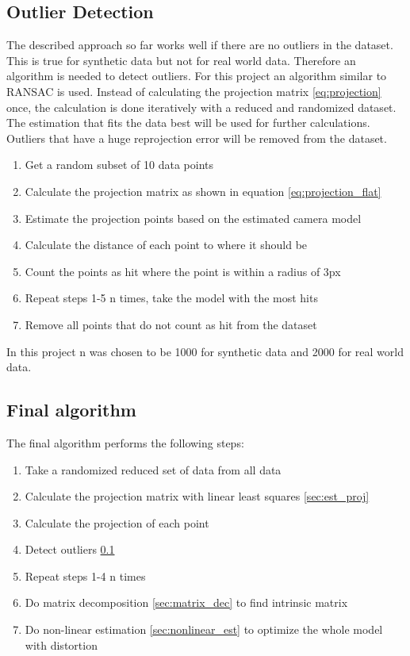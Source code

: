 \documentclass[11pt,a4paper,titlepage,oneside]{report}
\begin{document}
\subsection{Outlier Detection}\label{sec:outliers}
The described approach so far works well if there are no outliers in the dataset. This is true for synthetic data but not for real world data. Therefore an algorithm is needed to detect outliers. For this project an algorithm similar to RANSAC \cite{ransac} is used. Instead of calculating the projection matrix \ref{eq:projection} once, the calculation is done iteratively with a reduced and randomized dataset. The estimation that fits the data best will be used for further calculations. Outliers that have a huge reprojection error will be removed from the dataset.
\begin{enumerate}
	\item Get a random subset of 10 data points
	\item Calculate the projection matrix as shown in equation \ref{eq:projection_flat}
	\item Estimate the projection points based on the estimated camera model
	\item Calculate the distance of each point to where it should be
	\item Count the points as hit where the point is within a radius of 3px
	\item Repeat steps 1-5 n times, take the model with the most hits
	\item Remove all points that do not count as hit from the dataset
\end{enumerate}

In this project n was chosen to be 1000 for synthetic data and 2000 for real world data.

\subsection{Final algorithm}
The final algorithm performs the following steps:
\begin{enumerate}
	\item Take a randomized reduced set of data from all data
	\item Calculate the projection matrix with linear least squares \ref{sec:est_proj}
	\item Calculate the projection of each point
	\item Detect outliers \ref{sec:outliers}
	\item Repeat steps 1-4 n times
	\item Do matrix decomposition \ref{sec:matrix_dec} to find intrinsic matrix
	\item Do non-linear estimation \ref{sec:nonlinear_est} to optimize the whole model with distortion
\end{enumerate}
\end{document}
